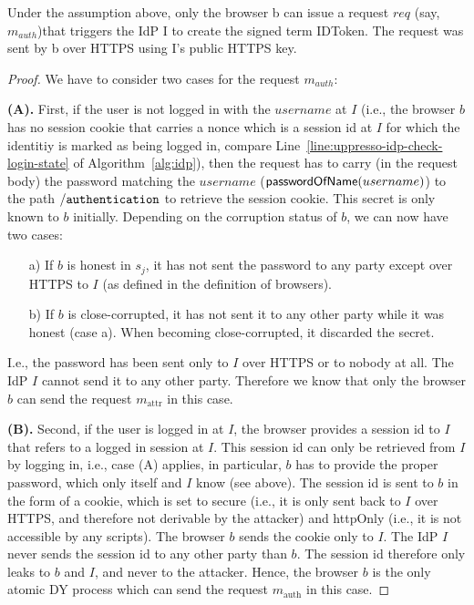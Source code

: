   \begin{lemma}\label{lemma:b-trigger-request}%
    Under the assumption above, only the browser b can issue a 
    request $req$ (say, $m_{auth}$)that triggers the IdP I to 
    create the signed term IDToken. The request was sent by b 
    over HTTPS using I's public HTTPS key.
  \end{lemma}
  \begin{proof}
    We have to consider two cases for the request $m_{auth}$:
  
    \textbf{(A).} First, if the user is not logged in with the 
    $username$ at $I$ (i.e., the browser $b$ has no session 
    cookie that carries a nonce which is a session id at $I$ for 
    which the identitiy is marked as being logged in, compare 
    Line~\ref{line:uppresso-idp-check-login-state} of 
    Algorithm~\ref{alg:idp}), then the request has to carry (in
    the request body) the password matching the $username$ 
    ($\mathsf{passwordOfName}(username)$) to the path $\mathtt{/authentication}$ to 
    retrieve the session cookie. This secret is only known to 
    $b$ initially. Depending on the corruption status of $b$, we 
    can now have two cases:
    \begin{enumerate}
    \item[a)] If $b$ is honest in $s_j$, it has not sent the 
      password to any party except over HTTPS to $I$ (as defined 
      in the definition of browsers). 
    \item[b)] If $b$ is close-corrupted, it has not sent it to 
      any other party while it was honest (case a). When 
      becoming close-corrupted, it discarded the secret.
    \end{enumerate}
  
    I.e., the password has been sent only to $I$ over HTTPS or 
    to nobody at all. The IdP $I$ cannot send it to any other 
    party. Therefore we know that only the browser $b$ can send 
    the request $m_\text{attr}$ in this case.
  
    \textbf{(B).} Second, if the user is logged in at $I$, the 
    browser provides a session id to $I$ that refers to a 
    logged in session at $I$. This session id can only be 
    retrieved from $I$ by logging in, i.e., case (A) applies, 
    in particular, $b$ has to provide the proper password, 
    which only itself and $I$ know (see above). The session id 
    is sent to $b$ in the form of a cookie, which is set to 
    secure (i.e., it is only sent back to $I$ over HTTPS, and
    therefore not derivable by the attacker) and httpOnly 
    (i.e., it is not accessible by any scripts). The browser $b$ 
    sends the cookie only to $I$. The IdP $I$ never sends the 
    session id to any other party than $b$. The session id 
    therefore only leaks to $b$ and $I$, and never to the 
    attacker. Hence, the browser $b$ is the only atomic DY 
    process which can send the request $m_\text{auth}$ in this case.
  

\end{proof}
